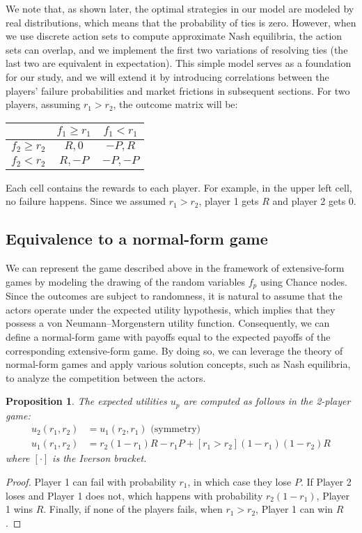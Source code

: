 \documentclass[preprint,12pt,authoryear,doubleblind]{elsarticle}
\newtheorem{proposition}[theorem]{Proposition}
\theoremstyle{definition}
\begin{document}
We note that, as shown later, the optimal strategies in our model are modeled by real distributions, which means that the probability of ties is zero. However, when we use discrete action sets to compute approximate Nash equilibria, the action sets can overlap, and we implement the first two variations of resolving ties (the last two are equivalent in expectation). This simple model serves as a foundation for our study, and we will extend it by introducing correlations between the players' failure probabilities and market frictions in subsequent sections.
For two players, assuming $r_1 > r_2$, the outcome matrix will be:

\begin{center}
\begin{tabular}{|c|c|c|}
\cline{2-3}
\multicolumn{1}{c|}{} & $f_1\ge r_1$ & $f_1<r_1$ \\
\hline
$f_2\ge r_2$ & $R, 0$ & $-P, R$ \\
\hline
$f_2<r_2$ & $R, -P$ &  $-P, -P$ \\
\hline
\end{tabular}
\end{center}


Each cell contains the rewards to each player. For example, in the upper left cell, no failure happens. Since we assumed $r_1 > r_2$, player 1 gets $R$ and player 2 gets $0$.

\subsection{Equivalence to a normal-form game}

We can represent the game described above in the framework of extensive-form games by modeling the drawing of the random variables $f_p$ using Chance nodes. Since the outcomes are subject to randomness, it is natural to assume that the actors operate under the expected utility hypothesis, which implies that they possess a von Neumann–Morgenstern utility function. Consequently, we can define a normal-form game with payoffs equal to the expected payoffs of the corresponding extensive-form game. By doing so, we can leverage the theory of normal-form games and apply various solution concepts, such as Nash equilibria, to analyze the competition between the actors.
\begin{proposition}
The expected utilities $u_p$ are computed as follows in the 2-player game:
\begin{align*}
    u_2(r_1, r_2) &= u_1(r_2, r_1) \text{~(symmetry)}\\
    u_1(r_1, r_2) &= r_2 (1-r_1) R - r_1 P + [ r_1 > r_2 ] (1-r_1)(1-r_2) R
\end{align*}
where $[ \cdot ]$ is the Iverson bracket.
\end{proposition}
\begin{proof}
Player 1 can fail with probability $r_1$, in which case they lose $P$. If Player 2 loses and Player 1 does not, which happens with probability $r_2(1-r_1)$, Player 1 wins $R$. Finally, if none of the players fails, when $r_1 > r_2$, Player 1 can win $R$.
\end{proof}
\end{document}
